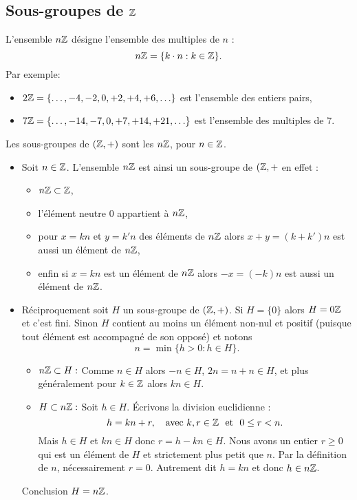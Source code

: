 \documentclass{book}
\begin{document}
\subsection{Sous-groupes de $\mathbb{Z}$}
\begin{Definition}[$n\Z$]
L'ensemble $n\Z$ désigne l'ensemble des multiples de $n$ :
$$n\mathbb{Z} = \{ k\cdot n : k \in \mathbb{Z}\}.$$
Par exemple:
\begin{itemize}
  \item $2\mathbb{Z} = \{\ldots, -4,-2,0,+2,+4,+6,\ldots\}$ est l'ensemble des entiers pairs,
  \item $7\mathbb{Z} =  \{\ldots, -14,-7,0,+7,+14,+21,\ldots\}$ est l'ensemble des multiples de $7$.
\end{itemize}
\end{Definition}
\begin{Proposition}
Les sous-groupes de $(\mathbb{Z},+)$ sont les $n\Z$, pour $n\in \mathbb{Z}$.
\end{Proposition}

\begin{Demonstration}
\begin{itemize}
\item Soit $n \in \mathbb{Z}$. L'ensemble $n\Z$ est ainsi un sous-groupe de $(\mathbb{Z},+$ en effet : 
\begin{itemize}
 \item $n\mathbb{Z} \subset \mathbb{Z}$,
 \item l'élément neutre $0$ appartient à $n\Z$,
 \item pour $x = kn$ et $y=k'n$ des éléments de $n\Z$ alors $x+y = (k+k')n$ est aussi un
élément de $n\Z$,
 \item enfin si $x=kn$ est un élément de $n\Z$ alors $-x=(-k)n$ est aussi un élément de $n\Z$.
\end{itemize}
\item Réciproquement soit $H$ un sous-groupe de $(\mathbb{Z},+)$.
Si $H=\{0\}$ alors $H = 0\mathbb{Z}$ et c'est fini. Sinon $H$ contient au moins un élément non-nul et positif (puisque tout élément est accompagné de son opposé) et
notons
$$n=\min \{ h > 0 : h \in H \}.$$
\begin{itemize}
 \item $n\mathbb{Z} \subset H : $ Comme $n\in H$ alors $-n \in H$, $2n=n+n \in H$, et plus généralement pour $k \in \mathbb{Z}$ alors $kn \in H$.
 \item $ H\subset n\mathbb{Z} : $
Soit $h \in H$. Écrivons la division euclidienne :
$$h = kn + r,\quad \text{avec } k,r \in \mathbb{Z}  \ \text{ et } \  0 \le r < n.$$
Mais $h\in H$ et $kn \in H$ donc
$r= h - kn \in H$. Nous avons un entier $r \ge 0$ qui est un élément de
$H$ et strictement plus petit que $n$. Par la définition de $n$, nécessairement
$r=0$. Autrement dit $h=kn$ et donc $h\in n\mathbb{Z}$.
\end{itemize}
Conclusion $H=n\mathbb{Z}$.
\end{itemize}










\end{Demonstration}
\end{document}
